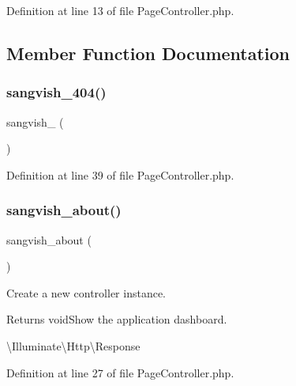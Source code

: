Definition at line 13 of file Page\+Controller.\+php.



\subsection{Member Function Documentation}
\mbox{\label{class_responsive_1_1_http_1_1_controllers_1_1_page_controller_a4c87941a5035ca67dde994ac05005930}} 
\subsubsection{\texorpdfstring{sangvish\_404()}{sangvish\_404()}}
{\footnotesize\ttfamily sangvish\+\_ (\begin{DoxyParamCaption}{ }\end{DoxyParamCaption})}



Definition at line 39 of file Page\+Controller.\+php.

\mbox{\label{class_responsive_1_1_http_1_1_controllers_1_1_page_controller_a9370ff7b65dd39229439eac305eb35bb}} 
\subsubsection{\texorpdfstring{sangvish\_about()}{sangvish\_about()}}
{\footnotesize\ttfamily sangvish\+\_\+about (\begin{DoxyParamCaption}{ }\end{DoxyParamCaption})}

Create a new controller instance.

\begin{DoxyReturn}{Returns}
void\+Show the application dashboard.

\textbackslash{}\+Illuminate\textbackslash{}\+Http\textbackslash{}\+Response 
\end{DoxyReturn}


Definition at line 27 of file Page\+Controller.\+php.

\mbox{\label{class_responsive_1_1_http_1_1_controllers_1_1_page_controller_adf6280461dd078b7dc477df314258279}} 
